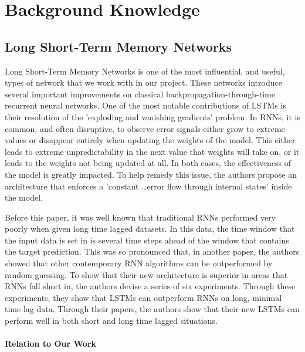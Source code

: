 \documentclass{article}
\begin{document}
    \section{Background Knowledge}

    \subsection{Long Short-Term Memory Networks}

    Long Short-Term Memory Networks\cite{LSTM} is one of the most influential, and useful, types of network that we work
    with in our project.  These networks introduce several important improvements on classical backpropagation-through-time
    recurrent neural networks.  One of the most notable contributions of LSTMs is their resolution of the 'exploding
    and vanishing gradients' problem.  In RNNs, it is common, and often disruptive, to observe error signals either
    grow to extreme values or disappear entirely when updating the weights of the model.  This either leads to
    extreme unpredictability in the next value that weights will take on, or it leads to the weights not being
    updated at all. In both cases, the effectiveness of the model is greatly impacted.  To help remedy this issue,
    the authors propose an architecture that enforces a 'constant \ldots error flow through internal states' inside the
    model.

    Before this paper, it was well known that traditional RNNs performed very poorly when given long time lagged
    datasets.   In this data, the time window that the input data is set in is several time steps ahead of the window
    that contains the target prediction.  This was so pronounced that, in another paper\cite{weightGuessing}, the authors
    showed that other contemporary RNN algorithms can be outperformed by random guessing.  To show that their new
    architecture is superior in areas that RNNs fall short in, the authors devise a series of six experiments.
    Through these experiments, they show that LSTMs can outperform RNNs on long, minimal time lag data.  Through their
    papers, the authors show that their new LSTMs can perform well in both short and long time lagged situations.

    \paragraph{Relation to Our Work}
\end{document}
